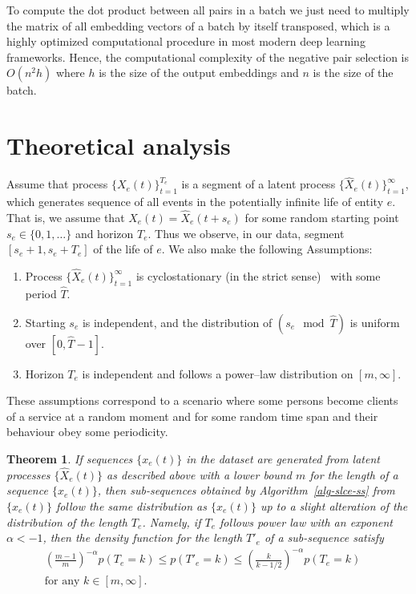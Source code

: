 \documentclass[sigconf, anonymous]{acmart}
\newtheorem{thm}{Theorem}
\begin{document}
To compute the dot product between all pairs in a batch we just need to multiply the matrix of all embedding vectors of a batch by itself transposed, which is a highly optimized computational procedure in most modern deep learning frameworks. Hence, the computational complexity of the negative pair selection is $O(n^2h)$ where $h$ is the size of the output embeddings and $n$ is the size of the batch.

\iffalse

\section{Theoretical analysis} \label{sec-theory}

Assume that process $\{X_e(t)\}_{t=1}^{T_e}$ is a segment of a latent process $\{\widehat{X}_e(t)\}_{t=1}^{\infty}$, which generates sequence of all events in the potentially infinite life of entity $e$. That is, we assume that $X_e(t)=\widehat{X}_e(t+s_e)$ for some random starting point $s_e\in \{0,1,\ldots\}$ and horizon $T_e$. Thus we observe, in our data, segment $[s_e+1,s_e+T_e]$ of the life of $e$. We also make the following Assumptions:
\begin{enumerate}
    \item Process $\{\widehat{X}_e(t)\}_{t=1}^{\infty}$ is cyclostationary (in the strict sense)~\citep{Gardner2006Cyclostationarity} with some period $\widehat{T}$.
    \item Starting $s_e$ is independent, and the distribution of $(s_e \mod \widehat{T})$ is uniform over $[0,\widehat{T}-1]$.
    \item Horizon $T_e$ is independent and follows a power--law distribution on $[m,\infty]$.
\end{enumerate}
These assumptions correspond to a scenario where some persons become clients of a service at a random moment and for some random time span and their behaviour obey some periodicity.    %
\begin{thm}\label{thm:distribution}
If sequences $\{x_e(t)\}$ in the dataset are generated from latent processes $\{\widehat{X}_e(t)\}$ as described above with a lower bound $m$ for the length of a sequence $\{x_e(t)\}$, then sub-sequences obtained by Algorithm~\ref{alg-slce-ss} from $\{x_e(t)\}$ follow the same distribution as $\{x_e(t)\}$ up to a slight alteration of the distribution of the length $T_e$. Namely, if $T_e$ follows power law with an exponent $\alpha <-1$, then the density function for the length $T'_e$ of a sub-sequence satisfy 
\begin{multline}\label{probability_ratio}
    \left (\frac{m-1}{m}\right )^{-\alpha} p(T_e=k)\leq p(T'_e=k) \leq \left(\frac{k}{k-1/2}\right )^{-\alpha} p(T_e=k)  \quad \\ \mbox{for any } k\in [m,\infty].
\end{multline}
\end{thm}
\end{document}
